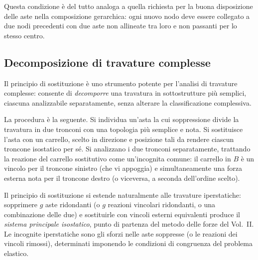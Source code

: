 Questa condizione è del tutto analoga a quella
richiesta per la buona disposizione delle aste
nella composizione gerarchica: ogni nuovo nodo deve
essere collegato a due nodi precedenti con due aste
non allineate tra loro e non passanti per lo stesso
centro.

\subsection{Decomposizione di travature complesse}
\label{subsec:decomposizione}

Il principio di sostituzione è uno strumento potente
per l'analisi di travature complesse: consente di
\emph{decomporre} una travatura in sottostrutture
più semplici, ciascuna analizzabile separatamente,
senza alterare la classificazione complessiva.

La procedura è la seguente. Si individua un'asta
la cui soppressione divide la travatura in due
tronconi con una topologia più semplice e nota.
Si sostituisce l'asta con un carrello, scelto in
direzione e posizione tali da rendere ciascun
troncone isostatico per sé. Si analizzano i due
tronconi separatamente, trattando la reazione del
carrello sostitutivo come un'incognita comune: il
carrello in $B$ è un vincolo per il troncone sinistro
(che vi appoggia) e simultaneamente una forza
esterna nota per il troncone destro (o viceversa,
a seconda dell'ordine scelto).

\begin{oss}
	Il principio di sostituzione si estende
	naturalmente alle travature iperstatiche:
	sopprimere $g$ aste ridondanti (o $g$ reazioni
	vincolari ridondanti, o una combinazione delle
	due) e sostituirle con vincoli esterni equivalenti
	produce il \emph{sistema principale isostatico},
	punto di partenza del metodo delle forze del
	Vol.~II. Le incognite iperstatiche sono gli sforzi
	nelle aste soppresse (o le reazioni dei vincoli
	rimossi), determinati imponendo le condizioni di
	congruenza del problema elastico.
\end{oss}





